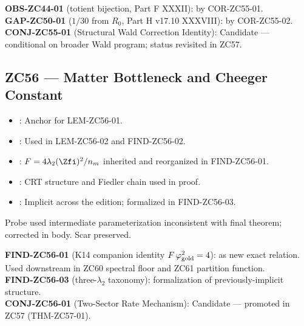 \documentclass[12pt, a4paper]{article}
\begin{document}
\begin{conmapbox}[title={ZC55 Closure Record}]
\textbf{OBS-ZC44-01} (totient bijection, Part F XXXII):
\closedcheck{} by COR-ZC55-01.\\[0.2em]
\textbf{GAP-ZC50-01} ($1/30$ from $R_0$, Part H v17.10 XXXVIII):
\closedcheck{} by COR-ZC55-02.\\[0.2em]
\textbf{CONJ-ZC55-01} (Structural Wald Correction Identity):
Candidate --- conditional on broader Wald program; status revisited
in ZC57.
\end{conmapbox}

\subsection{ZC56 --- Matter Bottleneck and Cheeger Constant}

\begin{inheritbox}[title={ZC56 Backward Inheritance}]
\begin{itemize}[leftmargin=1.5em]
\item {}: Anchor for LEM-ZC56-01.
\item {}:
  Used in LEM-ZC56-02 and FIND-ZC56-02.
\item {}:
  $F=4\lambda_{2}(\Zfi)^{2}/n_{m}$ inherited and reorganized in
  FIND-ZC56-01.
\item {}:
  CRT structure and Fiedler chain used in proof.
\item {}:
  Implicit across the edition; formalized in FIND-ZC56-03.
\end{itemize}
\end{inheritbox}

\begin{correctionbox}[title={ZC56 Forward Corrections / PMs}]
\begin{description}[leftmargin=1.5em]
\item[\pmdiamond{ZC56-PROBE-01}] Probe used intermediate
  parameterization inconsistent with final theorem; corrected in
  body. Scar preserved.
\end{description}
\end{correctionbox}

\begin{conmapbox}[title={ZC56 Promotion / Candidate Record}]
\textbf{FIND-ZC56-01} (K14 companion identity
$F\,\varphi_{\rm gold}^{2}=4$): \promotedstar{} as new exact
relation. Used downstream in ZC60 spectral floor and ZC61 partition
function.\\[0.2em]
\textbf{FIND-ZC56-03} (three-$\lambda_{2}$ taxonomy): \promotedstar{}
formalization of previously-implicit structure.\\[0.2em]
\textbf{CONJ-ZC56-01} (Two-Sector Rate Mechanism): Candidate ---
promoted in ZC57 (THM-ZC57-01).
\end{conmapbox}
\end{document}
